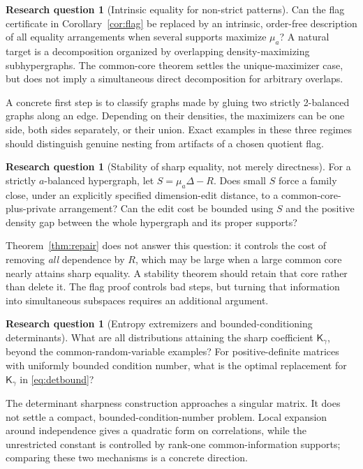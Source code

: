 \documentclass[11pt]{article}
\theoremstyle{definition}
\newtheorem{question}[theorem]{Research question}
\theoremstyle{remark}
\newcommand{\1}{\mathbf 1}
\newcommand{\Kopt}{\mathsf K}
\begin{document}
\begin{question}[Intrinsic equality for non-strict patterns]
Can the flag certificate in Corollary~\ref{cor:flag} be replaced by an intrinsic,
order-free description of all equality arrangements when several supports
maximize $\mu_a$? A natural target is a decomposition organized by overlapping
density-maximizing subhypergraphs. The common-core theorem settles the
unique-maximizer case, but does not imply a simultaneous direct decomposition
for arbitrary overlaps.
\end{question}

A concrete first step is to classify graphs made by gluing two strictly
2-balanced graphs along an edge. Depending on their densities, the maximizers
can be one side, both sides separately, or their union. Exact examples in these
three regimes should distinguish genuine nesting from artifacts of a chosen
quotient flag.

\begin{question}[Stability of sharp equality, not merely directness]
For a strictly $a$-balanced hypergraph, let
$S=\mu_a\Delta-R$. Does small $S$ force a family close, under an explicitly
specified dimension-edit distance, to a common-core-plus-private arrangement?
Can the edit cost be bounded using $S$ and the positive density gap between the
whole hypergraph and its proper supports?
\end{question}

Theorem~\ref{thm:repair} does not answer this question: it controls the cost of
removing \emph{all} dependence by $R$, which may be large when a large common
core nearly attains sharp equality. A stability theorem should retain that
core rather than delete it. The flag proof controls bad steps, but turning
that information into simultaneous subspaces requires an additional argument.

\begin{question}[Entropy extremizers and bounded-conditioning determinants]
What are all distributions attaining the sharp coefficient
$\Kopt_\gamma$, beyond the common-random-variable examples? For positive-definite
matrices with uniformly bounded condition number, what is the optimal
replacement for $\Kopt_\gamma$ in \eqref{eq:detbound}?
\end{question}

The determinant sharpness construction approaches a singular matrix. It does
not settle a compact, bounded-condition-number problem. Local expansion around
independence gives a quadratic form on correlations, while the unrestricted
constant is controlled by rank-one common-information supports; comparing these
two mechanisms is a concrete direction.
\end{document}
